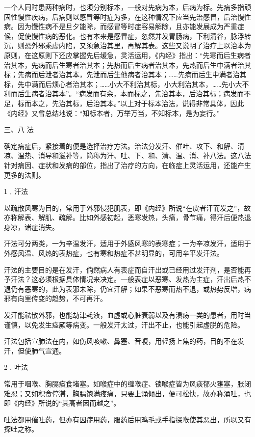 \documentclass[a4paper,12pt,UTF8,twoside]{ctexbook}
\begin{document}
一个人同时患两种病时，也须分别标本，一般对先病为本，后病为标。先病多指顽固性慢性疾病，后病则以感冒等时症为多，在这种情况下应当先治感冒，后治慢性病。因为慢性病不是旦夕能除，而感冒等时症容易解除，且亦能发展成为严重症候，促使慢性病的恶化。也有本来是感冒症，忽然并发胃肠病，下利清谷，脉浮转沉，则恐外邪乘虚内陷，又须急治其里，再解其表。这些又说明了治疗上以治本为原则，在这原则下还应掌握先后缓急，灵活运用，《内经》指出：“先寒而后生病者治其本，先病而后生寒者治其本；先热而后生病者治其本，先热而后生中满者治其标；先病而后泄者治其本，先泄而后生他病者治其本；……先病而后生中满者治其标，先中满而后烦心者治其本；……小大不利治其标，小大利治其本，……先小大不利而后生病者治其本”。“病发而有余，本而标之，先治其本，后治其标；病发而不足，标而本之，先治其标，后治其本。”以上对于标本治法，说得非常具体，因此《内经》又曾总结地说：“知标本者，万举万当，不知标本，是为妄行。”

三、八 法

确定病症后，紧接着的便是选择治疗方法。治法分发汗、催吐、攻下、和解、清凉、温热、消导和滋补等，简称为汗、吐、下、和、清、温、消、补八法。这八法针对病因、症状和发病的部位，指出了治疗的方向，在临症上灵活运用，还能产生更多的法则。

1﹒汗法

以疏散风寒为目的，常用于外邪侵犯肌表，即《内经》所说“在皮者汗而发之”，故亦称解表、解肌、疏解。比如外感初起，恶寒发热，头痛，骨节痛，得汗后便热退身凉，诸症消失。

汗法可分两类，一为辛温发汗，适用于外感风寒的表寒症；一为辛凉发汗，适用于外感风温、风热的表热症，也有寒和热症不甚明显的，可用辛平发汗法。

汗法的主要目的是在发汗，倘然病人有表症而自汗出或已经用过发汗剂，是否能再予汗法？这必须根据具体情况来决定。一般表症以恶寒、发热为主症，汗出后热不退仍有恶寒的，此为表邪未除，仍宜汗解；如果不恶寒而热不退，或热势反增，病邪有向里传变的趋势，不可再汗。

发汗能祛散外邪，也能劫津耗液，血虚或心脏衰弱以及有溃疡一类的患者，用时当谨慎，以免发生痉厥等病变。一般发汗太过，汗出不止，也能引起虚脱的危险。

汗法包括宣肺法在内，如伤风咳嗽、鼻塞、音嗄，用轻扬上焦的药，目的不在发汗，但使肺气宣通。

2﹒吐法

常用于咽喉、胸膈痰食堵塞。如喉症中的缠喉症、锁喉症皆为风痰郁火壅塞，胀闭难忍；又如积食停滞，胸膈饱满疼痛，只要上涌倾出，便可松快，故亦称涌吐，也即《内经》所说的“其高者因而越之”。

吐法都用催吐药，但亦有因症用药，服药后用鸡毛或手指探喉使其恶出，所以又有探吐之称。
\end{document}
